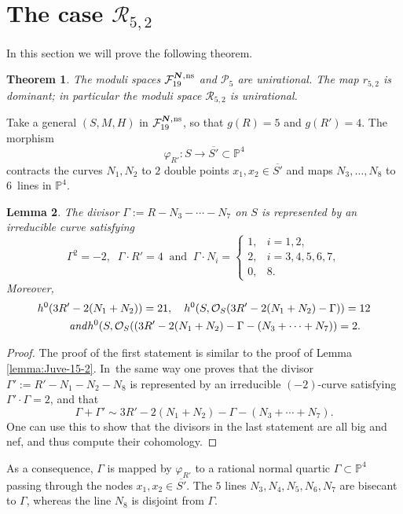 \documentclass[JEP,XML,SOM,Unicode,NoEqCountersInSection,published]{cedram}
\newcommand{\ns}{{\mkern1mu\mathrm{ns}}}
\newcommand{\bN}{\boldsymbol{N}}
\theoremstyle{plain}
\newtheorem{thm}{Theorem}[section]
\newtheorem{lemma}[thm]{Lemma}
\theoremstyle{definition}
\newcommand\PP{{\mathbb P}}
\newcommand\F{{\mathcal F}}
\renewcommand\O{{\mathcal O}}
\renewcommand\P{{\mathcal P}}
\newcommand\R{{\mathcal R}}
\begin{document}
\section{The case \texorpdfstring{$\R_{5,2}$}{R}}

In this section we will prove the following theorem.

\begin{thm}\label{thm:5,2}
The moduli spaces $\F_{19}^{\bN,\ns}$ and $\P_{5}$ are unirational. The map $r_{5,2}$ is dominant; in particular the moduli space $\R_{5,2}$ is unirational.
\end{thm}

Take a general $(S,M,H)$ in $\F_{19}^{\bN,\ns}$, so that $g(R)=5$ and $g(R')=4$. The morphism
\[
\varphi_{R'}:S\to \overline{S'}\subset \PP^4
\]
contracts the curves $N_1,N_2$ to $2$ double points $x_1,x_2 \in \overline{S'}$ and maps $N_3,\ldots,N_8$ to $6$~lines in $\PP^4$.

\begin{lemma} \label{lemma:Juve-15-4}
The divisor
$
\Gamma:=R-N_3-\cdots-N_7
$
on $S$ is represented by an irreducible curve satisfying
\[
 \Gamma^2=-2, \;\; \Gamma\cdot R'=4 \;\; \mbox{and} \;\; \Gamma \cdot N_i =
\begin{cases}
1, & i=1,2, \\
2, & i=3,4,5,6,7,\\
0, & 8.
\end{cases}
\]
Moreover,
\begin{gather*}
h^0(3R'-2(N_1+N_2))=21,\quad h^0(S,\O_S(3R'-2(N_1+N_2)-\Gamma))=12\\
\tag*{\textit{and}}
h^0(S,\O_S((3R'-2(N_1+N_2)-\Gamma-(N_3+\cdots+N_7))=2.
\end{gather*}
\end{lemma}

\begin{proof}
The proof of the first statement is similar to the proof of Lemma \ref{lemma:Juve-15-2}. In~the same way one proves that the divisor
$\Gamma':=R'-N_1-N_2-N_8$ is represented by an irreducible $(-2)$-curve satisfying $\Gamma' \cdot \Gamma=2$, and that
\[
\Gamma+\Gamma' \sim 3R'-2(N_1+N_2)-\Gamma-(N_3+\cdots+N_7).
\]
One can use this to show that the divisors in the last statement are all big and nef, and thus compute their cohomology.
\end{proof}

As a consequence, $\Gamma$ is mapped by $\varphi_{R'}$ to a rational normal quartic $\Gamma\subset \PP^4$ passing through the nodes $x_1,x_2\in \overline{S'}$. The $5$ lines $N_3,N_4,N_5,N_6,N_7$ are bisecant to $\Gamma$, whereas the line $N_8$ is disjoint from $\Gamma$.
\end{document}

